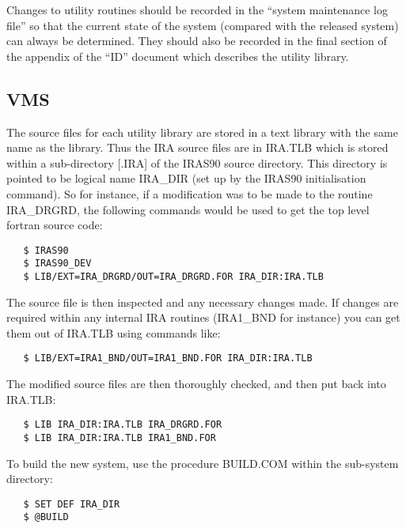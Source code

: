 Changes to utility routines should be recorded in the ``system maintenance log
file'' so that the current state of the system (compared with the released
system) can always be determined. They should also be recorded in the final
section of the appendix of the ``{\small ID}'' document which describes the
utility library.

\subsection{VMS}
The source files for each utility library are stored in a text library with the
same name as the library. Thus the {\small IRA} source files are in {\small
IRA.TLB} which is stored within a sub-directory {\small [.IRA]} of the {\small
IRAS90} source directory. This directory is pointed to be logical name {\small
IRA\_DIR} (set up by the {\small IRAS90} initialisation command). So for
instance, if a modification was to be made to the routine {\small IRA\_DRGRD},
the following commands would be used to get the top level fortran source code:

\small
\begin{verbatim}
   $ IRAS90
   $ IRAS90_DEV
   $ LIB/EXT=IRA_DRGRD/OUT=IRA_DRGRD.FOR IRA_DIR:IRA.TLB
\end{verbatim}
\normalsize

The source file is then inspected and any necessary changes made. If changes are
required within any internal {\small IRA} routines ({\small IRA1\_BND} for
instance) you can get them out of {\small IRA.TLB} using commands like:

\small
\begin{verbatim}
   $ LIB/EXT=IRA1_BND/OUT=IRA1_BND.FOR IRA_DIR:IRA.TLB
\end{verbatim}
\normalsize

The modified source files are then thoroughly checked, and then put back into
{\small IRA.TLB}:

\small
\begin{verbatim}
   $ LIB IRA_DIR:IRA.TLB IRA_DRGRD.FOR
   $ LIB IRA_DIR:IRA.TLB IRA1_BND.FOR
\end{verbatim}
\normalsize

To build the new system, use the procedure {\small BUILD.COM} within the
sub-system directory:

\small
\begin{verbatim}
   $ SET DEF IRA_DIR
   $ @BUILD
\end{verbatim}
\normalsize

